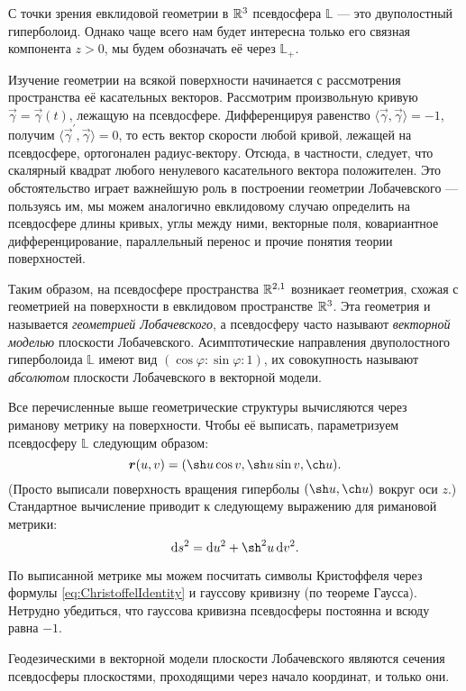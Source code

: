 С точки зрения евклидовой геометрии в $\mathbb{R}^3$ псевдосфера $\mathbb{L}$ --- это двуполостный гиперболоид. Однако чаще всего нам будет интересна только его связная компонента $z > 0$, мы будем обозначать её через $\mathbb{L}_+$.

Изучение геометрии на всякой поверхности начинается с рассмотрения пространства её касательных векторов. Рассмотрим произвольную кривую $\vec{\gamma} = \vec{\gamma}(t)$, лежащую на псевдосфере. Дифференцируя равенство $\langle\vec{\gamma}, \vec{\gamma}\rangle = -1$, получим $\langle\vec{\gamma}^\prime, \vec{\gamma}\rangle = 0$, то есть вектор скорости любой кривой, лежащей на псевдосфере, ортогонален радиус-вектору. Отсюда, в частности, следует, что скалярный квадрат любого ненулевого касательного вектора положителен. Это обстоятельство играет важнейшую роль в построении геометрии Лобачевского --- пользуясь им, мы можем аналогично евклидовому случаю определить на псевдосфере длины кривых, углы между ними, векторные поля, ковариантное дифференцирование, параллельный перенос и прочие понятия теории поверхностей.

Таким образом, на псевдосфере пространства $\mathbb{R}^{2, 1}$ возникает геометрия, схожая с геометрией на поверхности в евклидовом пространстве $\mathbb{R}^3$. Эта геометрия и называется \textit{геометрией Лобачевского}, а псевдосферу часто называют \textit{векторной моделью} плоскости Лобачевского. Асимптотические направления двуполостного гиперболоида $\mathbb{L}$ имеют вид $(\cos\varphi : \sin\varphi : 1)$, их совокупность называют \textit{абсолютом} плоскости Лобачевского в векторной модели.

Все перечисленные выше геометрические структуры вычисляются через риманову метрику на поверхности. Чтобы её выписать, параметризуем псевдосферу $\mathbb{L}$ следующим образом:
\[
	\vec{r}(u, v) = (\sh u\cos v, \sh u\sin v, \ch u).
\]
(Просто выписали поверхность вращения гиперболы $(\sh u, \ch u)$ вокруг оси $z$.) Стандартное вычисление приводит к следующему выражению для римановой метрики:
\[
	\d s^2 = \d u^2 + \sh^2u\d v^2.
\]

По выписанной метрике мы можем посчитать символы Кристоффеля через формулы \eqref{eq:ChristoffelIdentity} и гауссову кривизну (по теореме Гаусса). Нетрудно убедиться, что гауссова кривизна псевдосферы постоянна и всюду равна $-1$.

\begin{theorem}
	Геодезическими в векторной модели плоскости Лобачевского являются сечения псевдосферы плоскостями, проходящими через начало координат, и только они.
\end{theorem}

